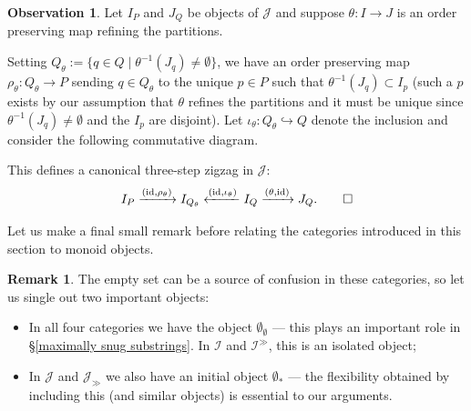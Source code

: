 \documentclass[12pt, reqno]{amsart}
\theoremstyle{plain}
\theoremstyle{definition}
\newtheorem{remark}[theorem]{Remark}
\newtheorem{observation}[theorem]{Observation}
\begin{document}
\begin{observation}\label{refinement zigzag}
Let $I_P$ and $J_Q$ be objects of $\mathcal{J}$ and suppose $\theta\colon I\rightarrow J$ is an order preserving map refining the partitions.

Setting $Q_\theta:=\{q\in Q\mid \theta^{-1}(J_q)\neq \emptyset\}$, we have an order preserving map $\rho_\theta\colon Q_\theta \rightarrow P$ sending $q\in Q_\theta$ to the unique $p\in P$ such that $\theta^{-1}(J_q)\subset I_p$ (such a $p$ exists by our assumption that $\theta$ refines the partitions and it must be unique since $\theta^{-1}(J_q)\neq \emptyset$ and the $I_p$ are disjoint). Let $\iota_\theta \colon Q_\theta\hookrightarrow Q$ denote the inclusion and consider the following commutative diagram.
\begin{center}
\end{center}

This defines a canonical three-step zigzag in $\mathcal{J}$:
\begin{equation*}
I_P\xrightarrow{(\operatorname{id},\rho_\theta)} I_{Q_{\theta}}\xleftarrow{(\operatorname{id},\iota_\theta)} I_Q\xrightarrow{(\theta,\operatorname{id})} J_Q.\qedhere
\end{equation*}
\end{observation}


Let us make a final small remark before relating the categories introduced in this section to monoid objects. 

\begin{remark}
The empty set can be a source of confusion in these categories, so let us single out two important objects:
\begin{itemize}
\item In all four categories we have the object $\emptyset_\emptyset$ --- this plays an important role in \S \ref{maximally snug substrings}. In $\mathcal{I}$ and $\mathcal{I}^\gg$, this is an isolated object;
\item In $\mathcal{J}$ and $\mathcal{J}_\gg$ we also have an initial object $\emptyset_\ast$ --- the flexibility obtained by including this (and similar objects) is essential to our arguments.\qedhere
\end{itemize}
\end{remark}
\end{document}
